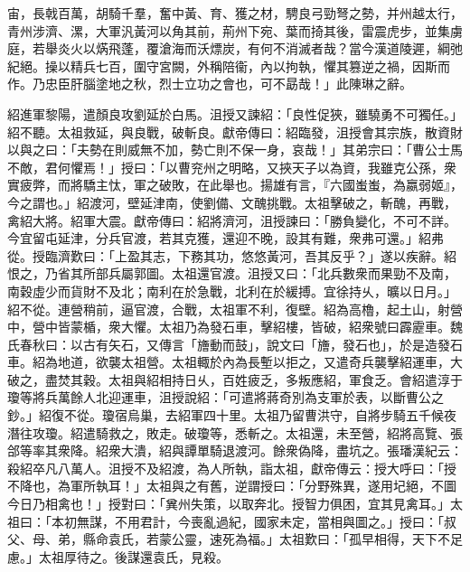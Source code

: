 \begin{pinyinscope}
宙，長戟百萬，胡騎千羣，奮中黃、育、獲之材，騁良弓勁弩之勢，并州越太行，青州涉濟、漯，大軍汎黃河以角其前，荊州下宛、葉而掎其後，雷震虎步，並集虜庭，若舉炎火以焫飛蓬，覆滄海而沃熛炭，有何不消滅者哉？當今漢道陵遲，綱弛紀絕。操以精兵七百，圍守宮闕，外稱陪衞，內以拘執，懼其篡逆之禍，因斯而作。乃忠臣肝腦塗地之秋，烈士立功之會也，可不勗哉！」此陳琳之辭。

紹進軍黎陽，遣顏良攻劉延於白馬。沮授又諫紹：「良性促狹，雖驍勇不可獨任。」紹不聽。太祖救延，與良戰，破斬良。獻帝傳曰：紹臨發，沮授會其宗族，散資財以與之曰：「夫勢在則威無不加，勢亡則不保一身，哀哉！」其弟宗曰：「曹公士馬不敵，君何懼焉！」授曰：「以曹兖州之明略，又挾天子以為資，我雖克公孫，衆實疲弊，而將驕主忲，軍之破敗，在此舉也。揚雄有言，『六國蚩蚩，為嬴弱姬』，今之謂也。」紹渡河，壁延津南，使劉備、文醜挑戰。太祖擊破之，斬醜，再戰，禽紹大將。紹軍大震。獻帝傳曰：紹將濟河，沮授諫曰：「勝負變化，不可不詳。今宜留屯延津，分兵官渡，若其克獲，還迎不晚，設其有難，衆弗可還。」紹弗從。授臨濟歎曰：「上盈其志，下務其功，悠悠黃河，吾其反乎？」遂以疾辭。紹恨之，乃省其所部兵屬郭圖。太祖還官渡。沮授又曰：「北兵數衆而果勁不及南，南穀虛少而貨財不及北；南利在於急戰，北利在於緩搏。宜徐持乆，曠以日月。」紹不從。連營稍前，逼官渡，合戰，太祖軍不利，復壁。紹為高櫓，起土山，射營中，營中皆蒙楯，衆大懼。太祖乃為發石車，擊紹樓，皆破，紹衆號曰霹靂車。魏氏春秋曰：以古有矢石，又傳言「旝動而鼓」，說文曰「旝，發石也」，於是造發石車。紹為地道，欲襲太祖營。太祖輙於內為長塹以拒之，又遣奇兵襲擊紹運車，大破之，盡焚其穀。太祖與紹相持日乆，百姓疲乏，多叛應紹，軍食乏。會紹遣淳于瓊等將兵萬餘人北迎運車，沮授說紹：「可遣將蔣奇別為支軍於表，以斷曹公之鈔。」紹復不從。瓊宿烏巢，去紹軍四十里。太祖乃留曹洪守，自將步騎五千候夜潛往攻瓊。紹遣騎救之，敗走。破瓊等，悉斬之。太祖還，未至營，紹將高覽、張郃等率其衆降。紹衆大潰，紹與譚單騎退渡河。餘衆偽降，盡坑之。張璠漢紀云：殺紹卒凡八萬人。沮授不及紹渡，為人所執，詣太祖，獻帝傳云：授大呼曰：「授不降也，為軍所執耳！」太祖與之有舊，逆謂授曰：「分野殊異，遂用圮絕，不圖今日乃相禽也！」授對曰：「兾州失策，以取奔北。授智力俱困，宜其見禽耳。」太祖曰：「本初無謀，不用君計，今喪亂過紀，國家未定，當相與圖之。」授曰：「叔父、母、弟，縣命袁氏，若蒙公靈，速死為福。」太祖歎曰：「孤早相得，天下不足慮。」太祖厚待之。後謀還袁氏，見殺。


\end{pinyinscope}
